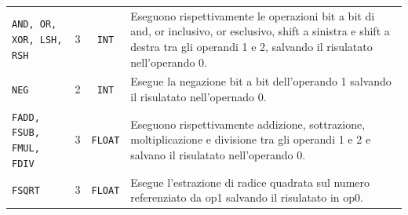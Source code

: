 \documentclass[a4paper, 11pt]{article}
\newcommand{\code}[1]{\scriptsize{\texttt{#1}}\normalsize}
\begin{document}
\begin{center}
\begin{tabular}{p{2.2 cm}|c|c|p{5.5 cm}}
\code{AND, OR, XOR, LSH, RSH} & 3 & \code{INT} & \footnotesize{Eseguono rispettivamente le operazioni bit a bit di and, or inclusivo, or esclusivo, shift a sinistra e shift a destra tra gli operandi 1 e 2, salvando il risulatato nell'operando 0. }\\

\code{NEG} & 2 & \code{INT} & \footnotesize{Esegue la negazione bit a bit dell'operando 1 salvando il risulatato nell'opernado 0.}\\

\code{FADD, FSUB, FMUL, FDIV} & 3 & \code{FLOAT} & \footnotesize{Eseguono rispettivamente addizione, sottrazione, moltiplicazione e divisione tra gli operandi 1 e 2 e salvano il risulatato nell'operando 0.}\\

\code{FSQRT} & 3 & \code{FLOAT} & \footnotesize{Esegue l'estrazione di radice quadrata sul numero referenziato da op1 salvando il risulatato in op0.}\\

\hline
\end{tabular}
\end{center}
\end{document}
